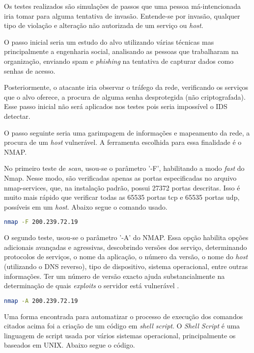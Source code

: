 Os testes realizados são simulações de passos que uma pessoa má-intencionada iria tomar para alguma tentativa de invasão. Entende-se por invasão, qualquer tipo de violação e alteração não autorizada de um serviço ou \textit{host}.

O passo inicial seria um estudo do alvo utilizando várias técnicas mas principalmente a engenharia social, analisando as pessoas que trabalharam na organização, enviando spam e \textit{phishing} na tentativa de capturar dados como senhas de acesso. 

Posteriormente, o atacante iria observar o tráfego da rede, verificando os serviços que o alvo oferece, a procura de alguma senha desprotegida (não criptografada). Esse passo inicial não será aplicados nos testes pois seria impossível o IDS detectar.

O passo seguinte seria uma garimpagem de informações e mapeamento da rede, a procura de um \textit{host} vulnerável. A ferramenta escolhida para essa finalidade é o NMAP. 

No primeiro teste de \textit{scan}, usou-se o parâmetro '-F', habilitando a modo \textit{fast} do Nmap. Nesse modo, são verificadas apenas as portas especificadas no arquivo nmap-services, que, na instalação padrão, possui 27372 portas descritas. Isso é muito mais rápido que verificar todas as 65535 portas tcp e 65535 portas udp, possíveis em um \textit{host}. Abaixo segue o comando usado.

\begin{lstlisting}[title={Comando NMAP no modo \textit{fast}},language=bash, frame=single, label={lst:nmap-F}]
    nmap -F 200.239.72.19
\end{lstlisting}

O segundo teste, usou-se o parâmetro '-A' do NMAP. Essa opção habilita opções adicionais avançadas e agressivas, descobrindo versões dos serviço, determinando protocolos de serviços, o nome da aplicação, o número da versão, o nome do \textit{host} (utilizando o DNS reverso), tipo de dispositivo, sistema operacional, entre outras informações. Ter um número de versão exacto ajuda substancialmente na determinação de quais \textit{exploits} o servidor está vulnerável \cite{nmap}.

\begin{lstlisting}[title={Comando NMAP no modo de descoberta de versões},language=bash, frame=single, label={lst:nmap-sv}]  
    nmap -A 200.239.72.19
\end{lstlisting}

Uma forma encontrada para automatizar o processo de execução dos comandos citados acima foi a criação de um código em \textit{shell script}. O \textit{Shell Script} é uma linguagem de script usada por vários sistemas operacional, principalmente os baseados em UNIX. Abaixo segue o código.

